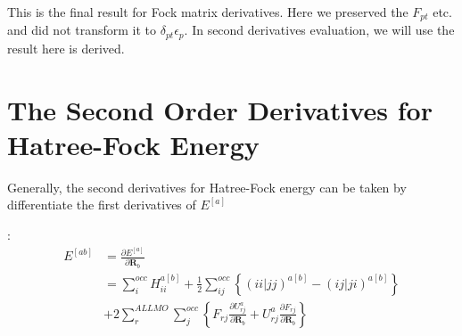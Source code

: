 This is the final result for Fock matrix derivatives. Here we
preserved the $F_{pt}$ etc. and did not transform it to
$\delta_{pt}\epsilon_{p}$. In second derivatives evaluation, 
we will use the result here is derived.   

\section{The Second Order Derivatives for Hatree-Fock Energy}
%
%
%
Generally, the second derivatives for Hatree-Fock energy can be
taken by differentiate the first derivatives of $E^{[a]}$
\begin{comment}
\footnote{
Here we do not start from the general expression below:
\begin{equation}
E^{[ab]} = \sum_{i}^{occ}H_{ii}^{[ab]} + \frac{1}{2}
    \sum_{ij}^{occ}
    \left \{ ( ii|jj)^{[ab]} - ( ij|ji)^{[ab]}
    \right \} 
\end{equation}
Actually I doubt that this expression is wrong. I have tried to bring the
$\Pi^{[ab]}$ and $H^{[ab]}$ into this expression, but it does not give the
correct result. I think that the reason can be expressed in the following way.
Firstly, for the integral of  $\Pi$ and $H$, they are actually some multivariate
function of $\bm{R}$. For the first derivatives, they are able to keep the
invariance of differential form, so we can generally express them as $H^{[a]}$
and $\Pi^{[a]}$; but for the second derivatives, such invariance breaks; so we
can not differentiate $\Pi^{[a]}$ to get $\Pi^{[ab]}$ to obtain the result. This
is like to differentiate the function:
\begin{equation}
f(x_{1}, \cdots, x_{n}, y_{1}(x_{1},
\cdots, x_{n}), \cdots, y_{m}(x_{1}, \cdots, x_{n}), z_{1}(x_{1},
\cdots, x_{n}), \cdots, z_{l}(x_{1}, \cdots, x_{n})) 
\end{equation}
Here $y$ is similar to MO $i$, and $z$ is similar to MO $j$, and $x$ is the
variable of $\bm{R}$. 

On the other hand, we can observe that  the MO $i$ and
$j$ are symmetrical in the energy expression. Hence in the second derivatives,
The factor of $1/2$ may diminish. Based on this point, we suspect that the
section 4.7 in Fritz's book\cite{New_Dimension_for_Derivatives_Calculation} may
be wrong.}
\end{comment}
:
\begin{equation}
   \label{SOD_energy_hf_derivatives_eq:1}
\begin{split}
E^{[ab]} &= \frac{\partial E^{[a]}}{\partial
\bm{R}_{b}} \\
&=\sum_{i}^{occ}H_{ii}^{a[b]} + \frac{1}{2}
    \sum_{ij}^{occ}
    \left \{ ( ii|jj)^{a[b]} - ( ij|ji)^{a[b]}
    \right \}   \\
&+ 2\sum_{r}^{ALL
MO}\sum_{j}^{occ}\left\lbrace F_{rj}\frac{\partial U^{a}_{rj}}{\partial
\bm{R}_{b}} + U^{a}_{rj}\frac{\partial F_{rj}}{\partial
\bm{R}_{b}}\right\rbrace 
\end{split}
\end{equation}
